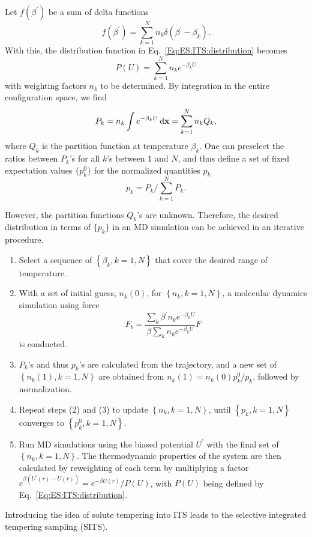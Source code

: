 Let $f(\beta^\prime)$ be a sum of delta functions
\begin{equation}
	f\left(\beta^{\prime}\right)=\sum_{k=1}^N n_k \delta\left(\beta^{\prime}-\beta_k\right) .
\end{equation}
With this, the distribution function in Eq.~\ref{Eq:ES:ITS:distribution} becomes
\begin{equation}
	P(U)=\sum_{k=1}^N n_k  e^{-\beta_k U}
\end{equation}
with weighting factors $n_k$ to be determined. By integration in  the entire configuration space, we find
\begin{equation}
	P_k= n_k \int e^{-\beta_k  U}\mathop{}\!\mathrm{d} \mathbf{x}=\sum_{k=1}^N n_k Q_k,
\end{equation}
where $Q_k$ is the partition function at temperature $\beta_k$. One can preselect the ratios between $P_k$'s for all $k$'s between $1$ and $N$, and thus define a set of fixed expectation values $\{p_k^0\}$ for the normalized quantities $p_k$
\begin{equation}
	p_k=P_k/\sum_{k=1}^N P_k.
\end{equation}

However, the partition functions $Q_k$'s are unknown. Therefore, the desired distribution in terms of $\{p_k\}$ in an MD simulation can be achieved in an iterative procedure.
\begin{enumerate}
	\item Select a sequence of $\left\{\beta_k, k=1, N\right\}$ that cover the desired range of temperature.
	\item With a set of initial guess, $n_k(0)$, for $\left\{n_k, k=1, N\right\}$, a molecular dynamics simulation using force
	$$
	F_b=\frac{\sum_k \beta^{\prime} n_k e^{-\beta_k U}}{\beta \sum_k n_k e^{-\beta_k U}} F
	$$
	is conducted.
	\item $P_k$'s and thus $p_k$'s are calculated from the trajectory, and a new set of $\left\{n_k(1), k=1, N\right\}$ are obtained from $n_k(1)=n_k(0) p_k^0 / p_k$, followed by normalization.
	\item Repeat steps (2) and (3) to update $\left\{n_k, k=1, N\right\}$, until $\left\{p_k, k=1, N\right\}$ converges to $\left\{p_k^0, k=1, N\right\}$.
	\item Run MD simulations using the biased potential $U^\prime$ with the final set of $\left\{n_k, k=1, N\right\}$. The thermodynamic properties of the system are then calculated by reweighting of each term by multiplying a factor $e^{\beta\left(U^{\prime}(r)-U(r)\right)}=e^{-\beta U(r)} / P(U)$, with $P(U)$ being defined by Eq.~\ref{Eq:ES:ITS:distribution}.
\end{enumerate}

Introducing the idea of solute tempering into ITS leads to the selective integrated tempering sampling (SITS).\cite{YangJCP2009}